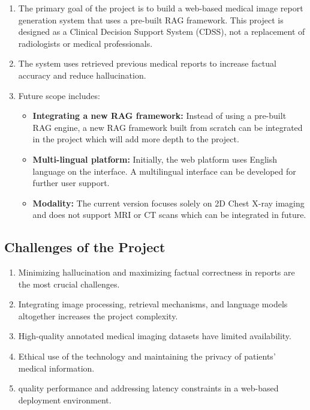 \begin{enumerate}
    \item The primary goal of the project is to build a web-based medical image report generation system that uses a pre-built RAG framework. This project is designed as a Clinical Decision Support System (CDSS), not a replacement of radiologists or medical professionals.
    
    \item The system uses retrieved previous medical reports to increase factual accuracy and reduce hallucination.
    
    \item Future scope includes:
    \begin{itemize}
        \item \textbf{Integrating a new RAG framework:} Instead of using a pre-built RAG engine, a new RAG framework built from scratch can be integrated in the project which will add more depth to the project.
        
        \item \textbf{Multi-lingual platform:} Initially, the web platform uses English language on the interface. A multilingual interface can be developed for further user support.
        
        \item \textbf{Modality:} The current version focuses solely on 2D Chest X-ray imaging and does not support MRI or CT scans which can be integrated in future.
    \end{itemize}
\end{enumerate}
\subsection{Challenges of the Project}

\begin{enumerate}
    \item Minimizing hallucination and maximizing factual correctness in reports are the most crucial challenges.
    
    \item Integrating image processing, retrieval mechanisms, and language models altogether increases the project complexity.
    
    \item High-quality annotated medical imaging datasets have limited availability.
    
    \item Ethical use of the technology and maintaining the privacy of patients’ medical information.
    
    \item  quality performance and addressing latency constraints in a web-based deployment environment.
\end{enumerate}





